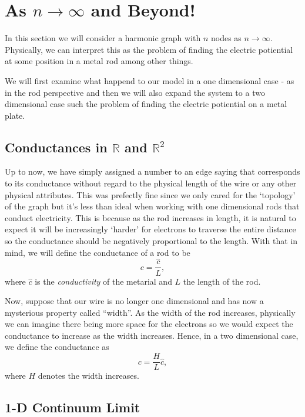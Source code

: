\documentclass[]{article}
\begin{document}
\section{\texorpdfstring{As \(n \to \infty\) and
Beyond!}{As n \textbackslash{}to \textbackslash{}infty and Beyond!}}\label{as-n-to-infty-and-beyond}

In this section we will consider a harmonic graph with \(n\) nodes as
\(n \to \infty\). Physically, we can interpret this as the problem of
finding the electric potiential at some position in a metal rod among
other things.

We will first examine what happend to our model in a one dimensional
case - as in the rod perspective and then we will also expand the system
to a two dimensional case such the problem of finding the electric
potiential on a metal plate.

\subsection{\texorpdfstring{Conductances in \(\mathbb{R}\) and
\(\mathbb{R}^2\)}{Conductances in \textbackslash{}mathbb\{R\} and \textbackslash{}mathbb\{R\}\^{}2}}\label{conductances-in-mathbbr-and-mathbbr2}

Up to now, we have simply assigned a number to an edge saying that
corresponds to its conductance without regard to the physical length of
the wire or any other physical attributes. This was prefectly fine since
we only cared for the `topology' of the graph but it's less than ideal
when working with one dimensional rods that conduct electricity. This is
because as the rod increases in length, it is natural to expect it will
be increasingly `harder' for electrons to traverse the entire distance
so the conductance should be negatively proportional to the length. With
that in mind, we will define the conductance of a rod to be \[
c = \frac{\hat{c}}{L},
\] where \(\hat{c}\) is the \emph{conductivity} of the metarial and
\(L\) the length of the rod.

Now, suppose that our wire is no longer one dimensional and has now a
mysterious property called ``width''. As the width of the rod increases,
physically we can imagine there being more space for the electrons so we
would expect the conductance to increase as the width increases. Hence,
in a two dimensional case, we define the conductance as
\[c = \frac{H}{L}\hat{c},\] where \(H\) denotes the width increases.

\subsection{1-D Continuum Limit}\label{d-continuum-limit}
\end{document}
